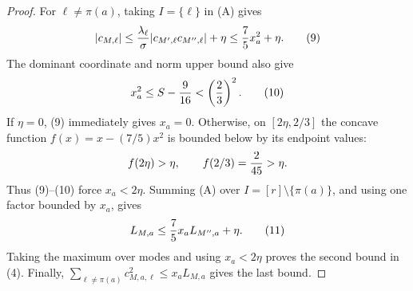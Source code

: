 \begin{proposition}
\begin{proof}
For \(\ell\ne\pi(a)\), taking \(I=\{\ell\}\) in (A) gives
\[
 |c_{M,\ell}|\le {\lambda_\ell\over\sigma}
 |c_{M',\ell}c_{M'',\ell}|+\eta
 \le {7\over5}x_a^2+\eta. \tag{9}
\]
The dominant coordinate and norm upper bound also give
\[
 x_a^2\le S-{9\over16}<\left({2\over3}\right)^2. \tag{10}
\]
If \(\eta=0\), (9) immediately gives \(x_a=0\). Otherwise, on
\([2\eta,2/3]\) the concave function \(f(x)=x-(7/5)x^2\) is bounded below
by its endpoint values:
\[
 f(2\eta)>\eta,\qquad f(2/3)={2\over45}>\eta.
\]
Thus (9)--(10) force \(x_a<2\eta\). Summing (A) over
\(I=[r]\setminus\{\pi(a)\}\), and using one factor bounded by \(x_a\), gives
\[
 L_{M,a}\le {7\over5}x_a L_{M'',a}+\eta. \tag{11}
\]
Taking the maximum over modes and using \(x_a<2\eta\) proves the second
bound in (4). Finally,
\(\sum_{\ell\ne\pi(a)}c_{M,a,\ell}^2\le x_aL_{M,a}\) gives the last
bound. 


\end{proof}
\end{proposition}
